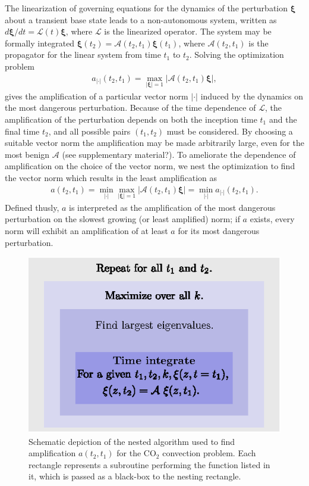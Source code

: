 \documentclass[letterpaper,10pt,prl,twocolumn,aps,reprint,superscriptaddress]{revtex4-1}
\newcommand{\cotwo}{CO$_2$ }
\newcommand{\cL}{\boldsymbol{\mathcal{L}}}
\newcommand{\cA}{\boldsymbol{\mathcal{A}}}
\newcommand{\prt}{\boldsymbol{\xi}}
\newcommand{\nrm}{{|\cdot|}}
\begin{document}
The linearization of governing equations for the dynamics of the perturbation $\prt$ about a transient base state leads to a non-autonomous system, written as ${d\prt}/{dt} = \cL(t)\prt$, where $\cL$ is the linearized operator. 
The system may be formally integrated $\prt (t_2) = \cA(t_2, t_1) \prt (t_1)$, where $\cA (t_2, t_1)$ is the propagator for the linear system from time $t_1$ to $t_2$. Solving the optimization problem 
\begin{align}
a_\nrm(t_2, t_1) = \max_{|\prt|=1} {| \cA(t_2, t_1) \prt|}, \label{eqn:amp1}
\end{align}
gives the amplification of a particular vector norm $|\cdot|$ induced by the dynamics on the most dangerous perturbation. 
Because of the time dependence of $\cL$, the amplification of the perturbation depends on both the inception time $t_1$ and the final time $t_2$, and all possible pairs $(t_1, t_2)$ must be considered. 
By choosing a suitable vector norm the amplification may be made arbitrarily large, even for the most benign $\cA$ (see supplementary material?). 
To ameliorate the dependence of amplification on the choice of the vector norm, we nest the optimization to find the vector norm which results in the least amplification as
\begin{align}
a(t_2, t_1) = \min_{|\cdot|} \max_{|\prt|=1} {| \cA(t_2, t_1) \prt|} = \min_{|\cdot|} a_\nrm (t_2, t_1). \label{eqn:amp2}
\end{align}
Defined thusly, $a$ is interpreted as the amplification of the most dangerous perturbation on the slowest growing (or least amplified) norm; 
if $a$ exists, every norm will exhibit an amplification of at least $a$ for its most dangerous perturbation.
\begin{figure}
 \centering
 \includegraphics{./Figures/Algorithm}
 \caption{Schematic depiction of the nested algorithm used to find amplification $a(t_2, t_1)$ for the \cotwo convection problem. Each rectangle represents a subroutine performing the function listed in it, which is passed as a black-box to the nesting rectangle.}
 \label{fig:Algorithm}
\end{figure}
\end{document}
